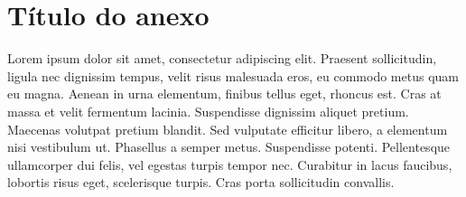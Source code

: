 %
%
%


\chapter{Título do anexo}
\label{anex:titulo}

Lorem ipsum dolor sit amet, consectetur adipiscing elit. Praesent sollicitudin,
ligula nec dignissim tempus, velit risus malesuada eros, eu commodo metus quam
eu magna. Aenean in urna elementum, finibus tellus eget, rhoncus est. Cras at
massa et velit fermentum lacinia. Suspendisse dignissim aliquet pretium.
Maecenas volutpat pretium blandit. Sed vulputate efficitur libero, a elementum
nisi vestibulum ut. Phasellus a semper metus. Suspendisse potenti. Pellentesque
ullamcorper dui felis, vel egestas turpis tempor nec. Curabitur in lacus
faucibus, lobortis risus eget, scelerisque turpis. Cras porta sollicitudin
convallis.

